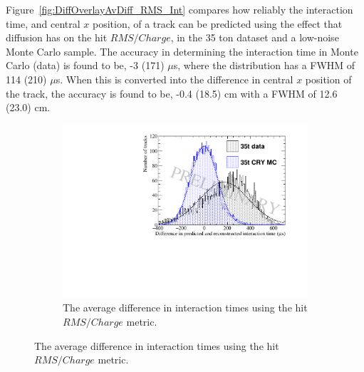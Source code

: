 Figure~\ref{fig:DiffOverlayAvDiff_RMS_Int} compares how reliably the interaction time, and central $x$ position, of a track can be predicted using the effect that diffusion has on the hit $RMS/Charge$, in the 35 ton dataset and a low-noise Monte Carlo sample. The accuracy in determining the interaction time in Monte Carlo (data) is found to be, -3 (171) $\mu$s, where the distribution has a FWHM of 114 (210) $\mu$s. When this is converted into the difference in central $x$ position of the track, the accuracy is found to be, -0.4 (18.5) cm with a FWHM of 12.6 (23.0) cm. \\

\begin{figure}[h!]
  \centering
  \begin{subfigure}{0.6\textwidth}
    \centering
    \includegraphics[width=\textwidth]{Overlay_AvTimeDiff_RMS_Int}
    \caption{The average difference in interaction times using the hit $RMS/Charge$ metric.}
    \label{fig:DiffOverlayAvDiff_RMS_Int_T}
  \end{subfigure}


\end{figure}
